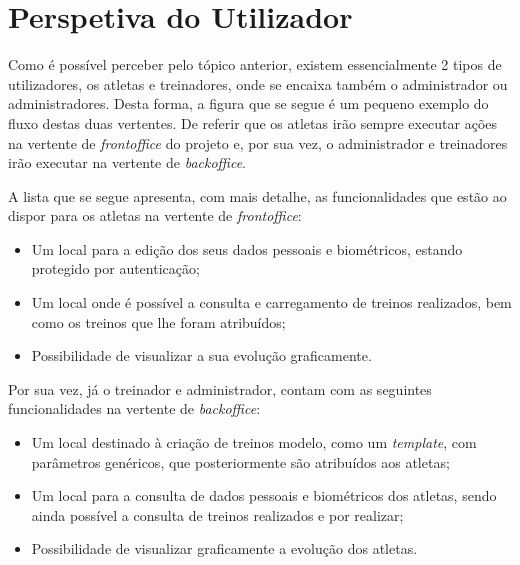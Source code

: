 \section{Perspetiva do Utilizador}

Como é possível perceber pelo tópico anterior, existem essencialmente 2 tipos de utilizadores, os atletas e treinadores, onde se encaixa também o administrador ou administradores. Desta forma, a figura que se segue é um pequeno exemplo do fluxo destas duas vertentes. De referir que os atletas irão sempre executar ações na vertente de \textit{frontoffice} do projeto e, por sua vez, o administrador e treinadores irão executar na vertente de \textit{backoffice}.


A lista que se segue apresenta, com mais detalhe, as funcionalidades que estão ao dispor para os atletas na vertente de \textit{frontoffice}:

\begin{itemize}
	\item Um local para a edição dos seus dados pessoais e biométricos, estando protegido por autenticação;
	\item Um local onde é possível a consulta e carregamento de treinos realizados, bem como os treinos que lhe foram atribuídos;
	\item Possibilidade de visualizar a sua evolução graficamente.
\end{itemize}

Por sua vez, já o treinador e administrador, contam com as seguintes funcionalidades na vertente de \textit{backoffice}:

\begin{itemize}
	\item Um local destinado à criação de treinos modelo, como um \textit{template}, com parâmetros genéricos, que posteriormente são atribuídos aos atletas;
	\item Um local para a consulta de dados pessoais e biométricos dos atletas, sendo ainda possível a consulta de treinos realizados e por realizar;
	\item Possibilidade de visualizar graficamente a evolução dos atletas.
\end{itemize}